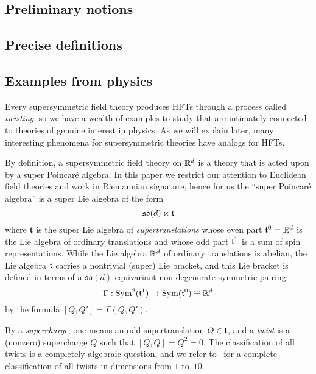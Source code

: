 \documentclass[11pt]{amsart}
\begin{document}
\subsection{Preliminary notions}


\subsection{Precise definitions}


\subsection{Examples from physics}


Every supersymmetric field theory produces HFTs through a process called {\em twisting},
so we have a wealth of examples to study that are intimately connected to theories of genuine interest in physics.
As we will explain later, many interesting phenomena for supersymmetric theories have analogs for HFTs.
 
By definition, a supersymmetric field theory on $\mathbb R^d$ is a theory that is acted upon by a super Poincar\'{e} algebra. 
In this paper we restrict our attention to Euclidean field theories and work in Riemannian signature,
hence for us the ``super Poincar\'{e} algebra'' is a super Lie algebra of the form
\[
\mathfrak{so}(d) \ltimes \mathfrak t
\]
where $\mathfrak t$ is the super Lie algebra of {\em supertranslations} whose even part $\mathfrak t^0 = \mathbb R^d$ is the Lie algebra of ordinary translations and whose odd part $\mathfrak t^1$ is a sum of spin representations. 
While the Lie algebra $\mathbb R^d$ of ordinary translations is abelian, the Lie algebra $\mathfrak t$ carries a nontrivial (super) Lie bracket,
and this Lie bracket is defined in terms of a $\mathfrak{so}(d)$-equivariant non-degenerate symmetric pairing
\[
\Gamma : {\rm Sym}^2(\mathfrak t^{1}) \to {\rm Sym}(\mathfrak t^0) \cong \mathbb R^d 
\]
by the formula $[Q, Q'] = \Gamma(Q, Q')$. 

By a {\em supercharge}, one means an odd supertranslation $Q \in \mathfrak t$, and
a {\em twist} is a (nonzero) supercharge $Q$ such that $[Q,Q] = Q^2 = 0$. 
The classification of all twists is a completely algebraic question,
and we refer to~\autocite{ESsusy} for a complete classification of all twists in dimensions from $1$ to~$10$. 
\end{document}
